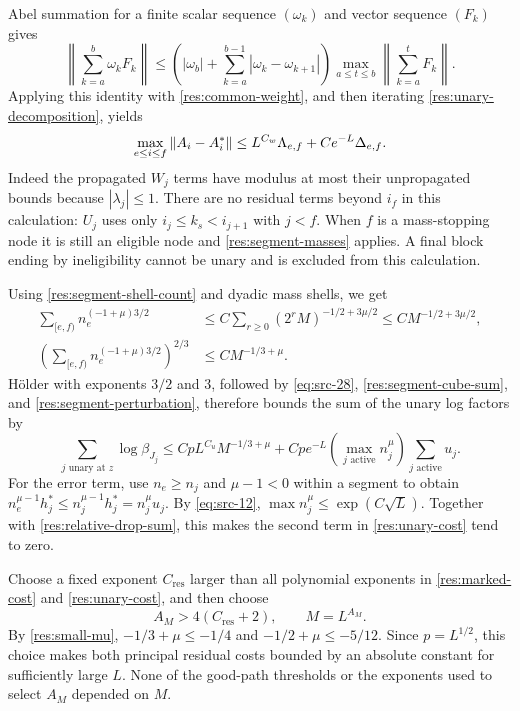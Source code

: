 Abel summation for a finite scalar sequence $(\omega_k)$ and vector
sequence $(F_k)$ gives
\[
 \left\|\sum_{k=a}^b\omega_k F_k\right\|
 \le \left(|\omega_b|+
             \sum_{k=a}^{b-1}|\omega_k-\omega_{k+1}|\right)
                \max_{a\le t\le b}
                       \left\|\sum_{k=a}^tF_k\right\|.
\]
Applying this identity with \eqref{res:common-weight}, and then
iterating \eqref{res:unary-decomposition}, yields
\begin{equation}
 \max_{e\le i\le f}\left\|A_i-A_i^*\right\|
    \le L^{C_w}\Lambda_{e,f}
           +Ce^{-L}\Delta_{e,f}.
 \label{res:segment-perturbation}
\end{equation}
Indeed the propagated $W_j$ terms have modulus at most their
unpropagated bounds because $|\lambda_j|\le1$.
There are no residual terms beyond $i_f$ in this calculation:
$U_j$ uses only $i_j\le k_s<i_{j+1}$ with $j<f$.
When $f$ is a mass-stopping node it is still an eligible node and
\eqref{res:segment-masses} applies.  A final block ending by
ineligibility cannot be unary and is excluded from this calculation.

Using \eqref{res:segment-shell-count} and dyadic mass shells, we get
\begin{equation}
 \begin{split}
 \sum_{[e,f)}n_e^{(-1+\mu)3/2}
   &\le C\sum_{r\ge0}(2^rM)^{-1/2+3\mu/2}
    \le C M^{-1/2+3\mu/2},\\
 \left(\sum_{[e,f)}n_e^{(-1+\mu)3/2}\right)^{2/3}
   &\le C M^{-1/3+\mu}.
 \end{split}
 \label{res:segment-weight-sum}
\end{equation}
H\"older with exponents $3/2$ and $3$, followed by
\eqref{eq:src-28}, \eqref{res:segment-cube-sum}, and
\eqref{res:segment-perturbation}, therefore bounds the sum of the
unary log factors by
\begin{equation}
 \sum_{j\text{ unary at }z}\log\beta_{J_j}
       \le CpL^{C_u}M^{-1/3+\mu}
          +Cp e^{-L}\left(\max_{j\text{ active}}n_j^\mu\right)
                              \sum_{j\text{ active}}u_j.
 \label{res:unary-cost}
\end{equation}
For the error term, use $n_e\ge n_j$ and $\mu-1<0$ within a
segment to obtain
$n_e^{\mu-1}h_j^*\le n_j^{\mu-1}h_j^*=n_j^\mu u_j$.
By \eqref{eq:src-12}, $\max n_j^\mu\le\exp(C\sqrt L)$.
Together with \eqref{res:relative-drop-sum}, this makes the second
term in \eqref{res:unary-cost} tend to zero.

Choose a fixed exponent $C_{\mathrm{res}}$ larger than all polynomial
exponents in \eqref{res:marked-cost} and \eqref{res:unary-cost},
and then choose
\begin{equation}
  A_M>4(C_{\mathrm{res}}+2),\qquad M=L^{A_M}.
  \label{res:choice-M}
\end{equation}
By \eqref{res:small-mu}, $-1/3+\mu\le-1/4$ and
$-1/2+\mu\le-5/12$.  Since $p=L^{1/2}$, this choice makes both
principal residual costs bounded by an absolute constant for
sufficiently large $L$.  None of the good-path thresholds or the
exponents used to select $A_M$ depended on $M$.

